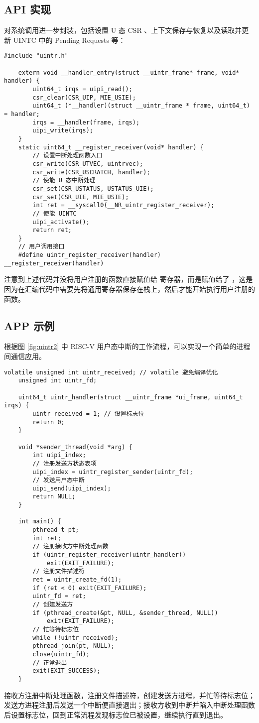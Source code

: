 \subsection{API 实现}

对系统调用进一步封装，包括设置 U 态 CSR 、上下文保存与恢复以及读取并更新 UINTC 中的 Pending Requests 等：

\begin{lstlisting}[style=CStyle]
    #include "uintr.h"

    extern void __handler_entry(struct __uintr_frame* frame, void* handler) {
        uint64_t irqs = uipi_read();
        csr_clear(CSR_UIP, MIE_USIE);
        uint64_t (*__handler)(struct __uintr_frame * frame, uint64_t) = handler;
        irqs = __handler(frame, irqs);
        uipi_write(irqs);
    }
    static uint64_t __register_receiver(void* handler) {
        // 设置中断处理函数入口
        csr_write(CSR_UTVEC, uintrvec);
        csr_write(CSR_USCRATCH, handler);
        // 使能 U 态中断处理
        csr_set(CSR_USTATUS, USTATUS_UIE);
        csr_set(CSR_UIE, MIE_USIE);
        int ret = __syscall0(__NR_uintr_register_receiver);
        // 使能 UINTC 
        uipi_activate();
        return ret;
    }
    // 用户调用接口
    #define uintr_register_receiver(handler) __register_receiver(handler)
\end{lstlisting}

注意到上述代码并没将用户注册的函数直接赋值给 \Rutvec 寄存器，而是赋值给了 \Ruscratch ，这是因为在汇编代码中需要先将通用寄存器保存在栈上，然后才能开始执行用户注册的函数。

\subsection{APP 示例}

根据图 \ref{fig:uintr2} 中 RISC-V 用户态中断的工作流程，可以实现一个简单的进程间通信应用。

\begin{lstlisting}[style=CStyle]
    volatile unsigned int uintr_received; // volatile 避免编译优化
    unsigned int uintr_fd;

    uint64_t uintr_handler(struct __uintr_frame *ui_frame, uint64_t irqs) {
        uintr_received = 1; // 设置标志位
        return 0;
    }

    void *sender_thread(void *arg) {
        int uipi_index;
        // 注册发送方状态表项
        uipi_index = uintr_register_sender(uintr_fd);
        // 发送用户态中断
        uipi_send(uipi_index);
        return NULL;
    }

    int main() {
        pthread_t pt;
        int ret;
        // 注册接收方中断处理函数
        if (uintr_register_receiver(uintr_handler))
            exit(EXIT_FAILURE);
        // 注册文件描述符
        ret = uintr_create_fd(1);
        if (ret < 0) exit(EXIT_FAILURE);
        uintr_fd = ret;
        // 创建发送方
        if (pthread_create(&pt, NULL, &sender_thread, NULL))
            exit(EXIT_FAILURE);
        // 忙等待标志位
        while (!uintr_received);
        pthread_join(pt, NULL);
        close(uintr_fd);
        // 正常退出
        exit(EXIT_SUCCESS);
    }
\end{lstlisting}

接收方注册中断处理函数，注册文件描述符，创建发送方进程，并忙等待标志位；发送方进程注册后发送一个中断便直接退出；接收方收到中断并陷入中断处理函数后设置标志位，回到正常流程发现标志位已被设置，继续执行直到退出。